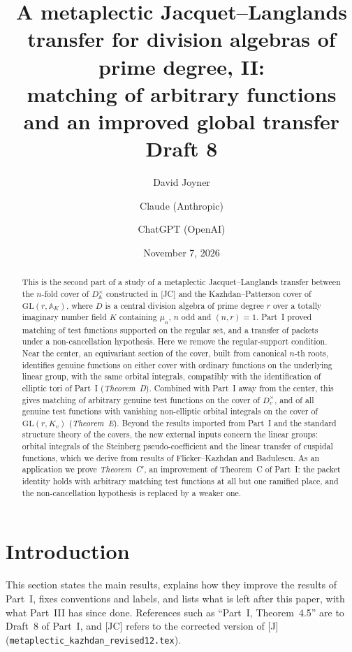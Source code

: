 \documentclass[12pt]{article}
\title{A metaplectic Jacquet--Langlands transfer for division algebras of prime degree, II:\\ matching of arbitrary functions and an improved global transfer\\[0.4em]\normalsize Draft 8}
\author{David Joyner \and Claude (Anthropic) \and ChatGPT (OpenAI)}
\date{November 7, 2026}
\newcommand{\A}{\mathbb{A}}
\newcommand{\GL}{\mathrm{GL}}
\theoremstyle{plain}
\theoremstyle{definition}
\begin{document}
\maketitle

\begin{abstract}
This is the second part of a study of a metaplectic Jacquet--Langlands transfer between the $n$-fold cover of $D^\times_{\A}$ constructed in [JC] and the Kazhdan--Patterson cover of $\GL(r,\A_K)$, where $D$ is a central division algebra of prime degree $r$ over a totally imaginary number field $K$ containing $\mu_n$, $n$ odd and $(n,r)=1$. Part~I proved matching of test functions supported on the regular set, and a transfer of packets under a non-cancellation hypothesis. Here we remove the regular-support condition. Near the center, an equivariant section of the cover, built from canonical $n$-th roots, identifies genuine functions on either cover with ordinary functions on the underlying linear group, with the same orbital integrals, compatibly with the identification of elliptic tori of Part~I (\emph{Theorem~D}). Combined with Part~I away from the center, this gives matching of arbitrary genuine test functions on the cover of $D_v^\times$, and of all genuine test functions with vanishing non-elliptic orbital integrals on the cover of $\GL(r,K_v)$ (\emph{Theorem~E}). Beyond the results imported from Part~I and the standard structure theory of the covers, the new external inputs concern the linear groups: orbital integrals of the Steinberg pseudo-coefficient and the linear transfer of cuspidal functions, which we derive from results of Flicker--Kazhdan and Badulescu. As an application we prove \emph{Theorem~C$'$}, an improvement of Theorem~C of Part~I: the packet identity holds with arbitrary matching test functions at all but one ramified place, and the non-cancellation hypothesis is replaced by a weaker one.
\end{abstract}

\tableofcontents

\section{Introduction}\label{sec:intro}
This section states the main results, explains how they improve the results of Part~I, fixes conventions and labels, and lists what is left after this paper, with what Part~III has since done. References such as ``Part~I, Theorem~4.5'' are to Draft~8 of Part~I, and [JC] refers to the corrected version of [J] (\texttt{metaplectic\_kazhdan\_revised12.tex}).
\end{document}
